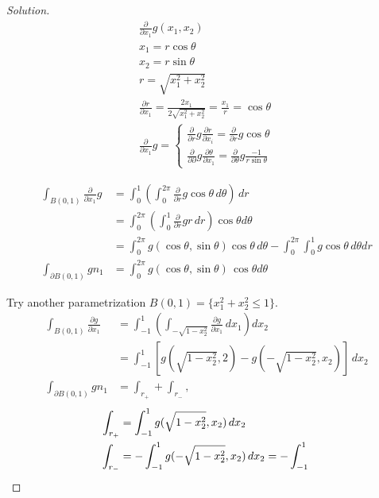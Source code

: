 \documentclass{report}
\theoremstyle{tommy}
\begin{document}
\begin{proof}[Solution]
  \begin{align*}
    \frac{\partial}{\partial x_1} g(x_1, x_2) \\
    x_1 = r \cos \theta \\
    x_2 = r \sin \theta \\
    r = \sqrt{x_1^2 + x_2^2} \\
    \frac{\partial r}{\partial x_1} = \frac{2 x_1}{2 \sqrt{x_1^2 + x_2^2}} = \frac{x_1}{r} = \cos \theta \\
    \frac{\partial}{\partial x_1} g = 
    \begin{cases}
      \frac{\partial}{\partial r} g \frac{\partial r}{\partial x_i} = \frac{\partial}{\partial r} g \cos \theta \\
      \frac{\partial}{\partial \partial} g \frac{\partial \theta}{\partial x_1} = \frac{\partial}{\partial \theta} g \frac{-1}{r \sin \theta}
    \end{cases}
  \end{align*}

  \begin{align*}
    \int_{B(0,1)} \frac{\partial}{\partial x_1}g 
    &= \int_0^1 \left(\int_0^{2 \pi} \frac{\partial}{\partial r} g \cos \theta \, d \theta \right) \, dr \\
    &= \int_0^{2 \pi} \left(\int_0^1 \frac{\partial}{\partial r} g r \, dr \right) \cos \theta d \theta \\
    &= \int_0^{2 \pi} g(\cos \theta, \sin \theta) \cos \theta \, d \theta - \int_0^{2 \pi} \int_0^1 g \cos \theta \, d \theta d r \\
    \int_{\partial B(0, 1)} g n_1 &= \int_0^{2 \pi} g(\cos \theta, \sin \theta) \, \cos \theta d \theta
  \end{align*}

  Try another parametrization \(B(0,1) = \{x_1^2 + x_2^2 \le 1 \}\).
  \begin{align*}
    \int_{B(0,1)} \frac{\partial g}{\partial x_1}
    &= \int_{-1}^1 \left(\int_{-\sqrt{1 - x_2^2}} \frac{\partial g}{\partial x_1} \, dx_1\right) dx_2 \\
    &= \int_{-1}^1 \left[g(\sqrt{1-x_2^2}, 2) - g(-\sqrt{1-x_2^2}, x_2)\right] \, dx_2 \\
    \int_{\partial B(0,1)} g n_1 &= \int_{r_+} + \int_{r_-}, 
  \end{align*}
  \begin{align*}
    \int_{r_+} &= \int_{-1}^1 g(\sqrt{1-x_2^2}, x_2) \, dx_2 \\
    \int_{r_-} &= - \int_{-1}^1 g(-\sqrt{1-x_2^2}, x_2) \, dx_2 = - \int_{-1}^1 \qedhere
  \end{align*}
\end{proof}
\end{document}
